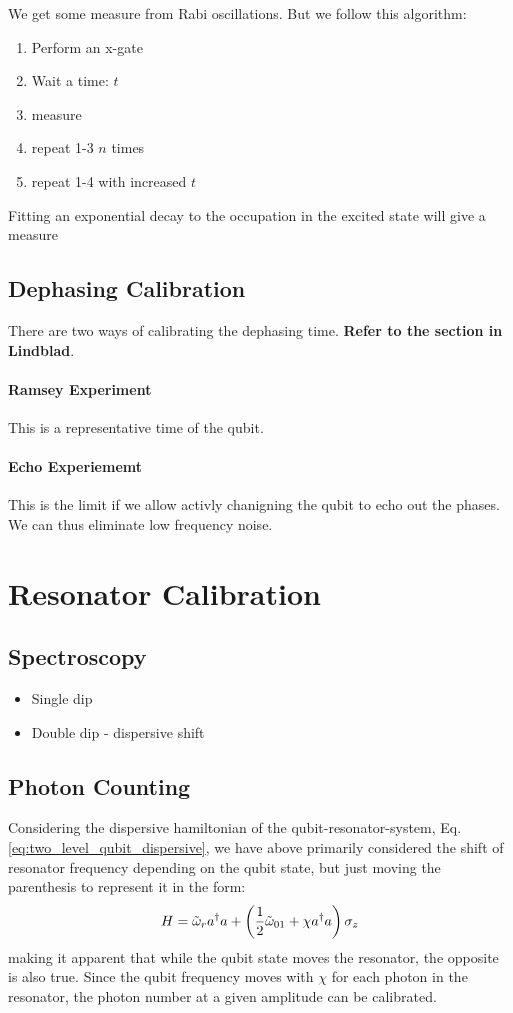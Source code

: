 We get some measure from Rabi oscillations. But we follow this algorithm:

\begin{enumerate}
    \item Perform an x-gate
    \item Wait a time: $t$ 
    \item measure 
    \item repeat 1-3 $n$ times
    \item repeat 1-4 with increased $t$
\end{enumerate}

Fitting an exponential decay to the occupation in the excited state will give a measure 

\subsection{Dephasing Calibration}
There are two ways of calibrating the dephasing time. \textbf{Refer to the section in Lindblad}.

\paragraph{Ramsey Experiment}
This is a representative time of the qubit.

\paragraph{Echo Experiememt}
This is the limit if we allow activly chanigning the qubit to echo out the phases. We can thus eliminate low frequency noise.


\section{Resonator Calibration}
\subsection{Spectroscopy}
\begin{itemize}
    \item Single dip
    \item Double dip - dispersive shift
\end{itemize}

\subsection{Photon Counting}
Considering the dispersive hamiltonian of the qubit-resonator-system, Eq. \ref{eq:two_level_qubit_dispersive}, we have above primarily considered the shift of resonator frequency depending on the qubit state, but just moving the parenthesis to represent it in the form:
\begin{equation}
    H = \Tilde{\omega}_r a^\dagger a  + \left(\frac12 \Tilde{\omega}_{01} + \chi a^\dagger a\right)  \sigma_z
\end{equation}
making it apparent that while the qubit state moves the resonator, the opposite is also true. Since the qubit frequency moves with $\chi$ for each photon in the resonator, the photon number at a given amplitude can be calibrated.  


